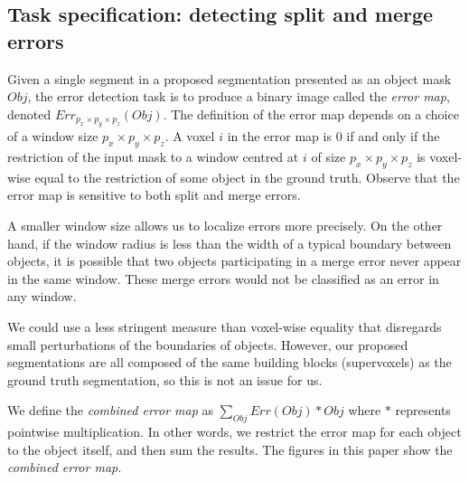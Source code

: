 \documentclass{article}
\begin{document}
\subsection{Task specification: detecting split and merge errors}
\label{sec:detection_spec}
Given a single segment in a proposed segmentation presented as an object mask $Obj$, the error detection task is to produce a binary image called the \textit{error map}, denoted $Err_{p_x\times p_y \times p_z}(Obj)$. The definition of the error map depends on a choice of a window size $p_x \times p_y \times p_z$. A voxel $i$ in the error map is 0 if and only if the restriction of the input mask to a window centred at $i$ of size $p_x \times p_y \times p_z$ is voxel-wise equal to the restriction of some object in the ground truth. Observe that the error map is sensitive to both split and merge errors.

A smaller window size allows us to localize errors more precisely. On the other hand, if the window radius is less than the width of a typical boundary between objects, it is possible that two objects participating in a merge error never appear in the same window. These merge errors would not be classified as an error in any window.

We could use a less stringent measure than voxel-wise equality that disregards small perturbations of the boundaries of objects. However, our proposed segmentations are all composed of the same building blocks (supervoxels) as the ground truth segmentation, so this is not an issue for us.

We define the \textit{combined error map} as $\sum_{Obj} Err(Obj) * Obj$ where $*$ represents pointwise multiplication. In other words, we restrict the error map for each object to the object itself, and then sum the results. The figures in this paper show the \textit{combined error map}.
\end{document}
